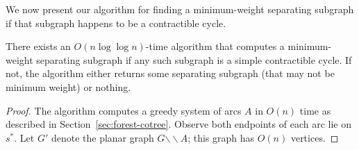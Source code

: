 \documentclass[letterpaper,review]{siamart190516}
\def\snip{\mathbin{\raisebox{0.15ex}{\rotatebox[origin=c]{60}{\Rightscissors}\!}}}
\def\snip{\mathbin{\backslash\!\!\backslash}}
\def\subsnip{\mathbin{\raisebox{0.15ex}{\rotatebox[origin=c]{60}{\footnotesize\Rightscissors}\!}}}
\def\Gsnip{\mathord{G_{\subsnip}}}
\def\Gsnip{G'}
\def\rnote#1{\color{red}Review: #1 \color{black}}
\def\knote#1{\textcolor{olive}{Kyle: #1}}
\begin{document}
{


We now present our algorithm for finding a minimum-weight separating subgraph if that subgraph happens to be a contractible cycle.

\begin{lemma}
\label{lem:contractible-alg}
There exists an $O(n \log \log n)$-time algorithm that computes a minimum-weight separating subgraph if any such subgraph is a simple contractible cycle. If not, the algorithm either returns some separating subgraph (that may not be minimum weight) or nothing.
\end{lemma}

\begin{proof}

The algorithm computes a greedy system of arcs $A$ in $O(n)$ time as described in
Section~\ref{sec:forest-cotree}.
Observe both endpoints of each arc lie on $s^*$.
Let $\Gsnip$ denote the planar graph $G \snip A$; this graph has $O(n)$ vertices.


\end{proof}}
\end{document}

